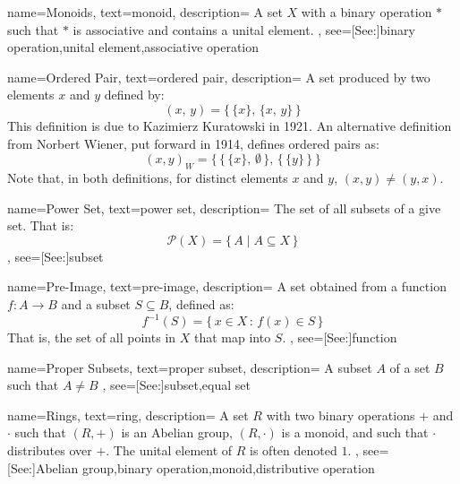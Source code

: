 {
    name={Monoids},
    text={monoid},
    description={
        A set $X$ with a binary operation $*$ such that
        $*$ is associative and contains a unital element.
    },
    see=[See:]{binary operation,unital element,associative operation}
}

{
    name={Ordered Pair},
    text={ordered pair},
    description={
        A set produced by two elements $x$ and $y$ defined by:
        \begin{equation*}
            (x,\,y)=\big\{\,\{x\},\,\{x,\,y\}\,\big\}
        \end{equation*}
        This definition is due to Kazimierz Kuratowski in 1921. An alternative
        definition from Norbert Wiener, put forward in 1914, defines ordered
        pairs as:
        \begin{equation*}
            (x,y)_{W}=\Big\{\,\big\{\,\{x\},\,\emptyset\,\big\},
                            \,\big\{\,\{y\}\,\big\}\,\Big\}
        \end{equation*}
        Note that, in both definitions, for distinct elements $x$ and $y$,
        $(x,y)\ne(y,x)$.
    }
}

{
    name={Power Set},
    text={power set},
    description={
        The set of all subsets of a give set. That is:
        \begin{equation*}
            \mathcal{P}(X)=\{\,A\;|\;A\subseteq{X}\,\}
        \end{equation*}
    },
    see=[See:]{subset}
}

{
    name={Pre-Image},
    text={pre-image},
    description={
        A set obtained from a function $f:A\rightarrow{B}$
        and a subset $S\subseteq{B}$, defined as:
        \begin{equation*}
            f^{\minus{1}}(S)=\{\,x\in{X}\,:\,f(x)\in{S}\,\}
        \end{equation*}
        That is, the set of all points in $X$ that map into $S$.
    },
    see=[See:]{function}
}

{
    name={Proper Subsets},
    text={proper subset},
    description={
        A subset $A$ of a set $B$ such that $A\ne{B}$
    },
    see=[See:]{subset,equal set}
}

{
    name={Rings},
    text={ring},
    description={
        A set $R$ with two binary operations $+$ and $\cdot$ such
        that $(R,+)$ is an Abelian group, $(R,\cdot)$ is a monoid,
        and such that $\cdot$ distributes over $+$.
        The unital element of $R$ is often denoted $1$.
    },
    see=[See:]{Abelian group,binary operation,monoid,distributive operation}
}

